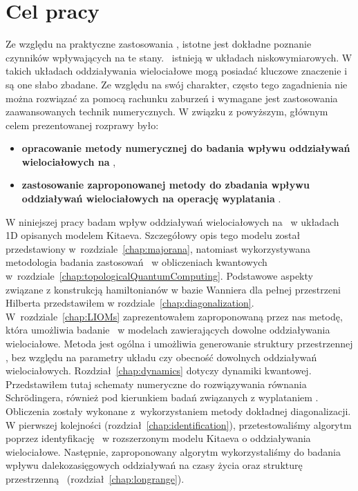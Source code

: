 \ornament

\section*{Cel pracy}

Ze względu na praktyczne zastosowania \MZM, istotne jest dokładne poznanie czynników wpływających na te stany. 
\MZM\ istnieją w układach niskowymiarowych.
W takich układach oddziaływania wielociałowe mogą posiadać kluczowe znaczenie  i są one słabo zbadane.
Ze względu na swój charakter, często tego zagadnienia nie można rozwiązać za pomocą rachunku zaburzeń i wymagane jest zastosowania zaawansowanych technik numerycznych.
W związku z powyższym, głównym celem prezentowanej rozprawy było:
\begin{itemize}
\item {\bf opracowanie metody numerycznej do badania wpływu oddziaływań wielociałowych na \MZM},
\item {\bf zastosowanie zaproponowanej metody do zbadania wpływu oddziaływań wielociałowych na operację wyplatania \MZM}.
\end{itemize}
W niniejszej pracy badam wpływ oddziaływań wielociałowych na \MZM\ w układach 1D opisanych modelem Kitaeva. 
Szczegółowy opis tego modelu został przedstawiony w~rozdziale~\ref{chap:majorana}, natomiast wykorzystywana metodologia badania zastosowań \MZM\ w obliczeniach kwantowych w~rozdziale~\ref{chap:topologicalQuantumComputing}.
Podstawowe aspekty związane z konstrukcją hamiltonianów w bazie Wanniera dla pełnej przestrzeni Hilberta przedstawiłem w rozdziale~\ref{chap:diagonalization}.
W~rozdziale~\ref{chap:LIOMs} zaprezentowałem zaproponowaną przez nas metodę, która umożliwia badanie \MZM\ w modelach zawierających dowolne oddziaływania wielociałowe.
Metoda jest ogólna i umożliwia generowanie struktury przestrzennej \MZM, bez względu na parametry układu czy obecność dowolnych oddziaływań wielociałowych.
Rozdział~\ref{chap:dynamics} dotyczy dynamiki kwantowej.
Przedstawiłem tutaj schematy numeryczne do rozwiązywania równania Schr\"odingera, również pod kierunkiem badań związanych z wyplataniem \MZM.
Obliczenia zostały wykonane z~wykorzystaniem metody dokładnej diagonalizacji.
W pierwszej kolejności (rozdział~\ref{chap:identification}), przetestowaliśmy algorytm poprzez identyfikację \MZM\ w rozszerzonym modelu Kitaeva o oddziaływania wielociałowe.
Następnie, zaproponowany algorytm wykorzystaliśmy do badania wpływu dalekozasięgowych oddziaływań na czasy życia oraz strukturę przestrzenną \MZM\ (rozdział~\ref{chap:longrange}).
